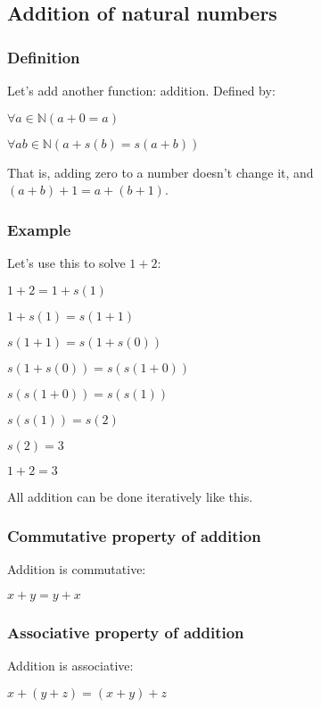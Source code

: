 \subsection{Addition of natural numbers}


\subsubsection{Definition}
Let’s add another function: addition. Defined by:

\(\forall a \in \mathbb{N} (a+0=a)\)

\(\forall a b \in \mathbb{N} (a+s(b)=s(a+b))\)

That is, adding zero to a number doesn’t change it, and \((a+b)+1=a+(b+1)\).

\subsubsection{Example}

Let’s use this to solve \(1+2\):

\(1+2=1+s(1)\)

\(1+s(1)=s(1+1)\)

\(s(1+1)=s(1+s(0))\)

\(s(1+s(0))=s(s(1+0))\)

\(s(s(1+0))=s(s(1))\)

\(s(s(1))=s(2)\)

\(s(2)=3\)

\(1+2=3\)

All addition can be done iteratively like this.

\subsubsection{Commutative property of addition}

Addition is commutative:

\(x+y=y+x\)

\subsubsection{Associative property of addition}

Addition is associative:

\(x+(y+z)=(x+y)+z\)

